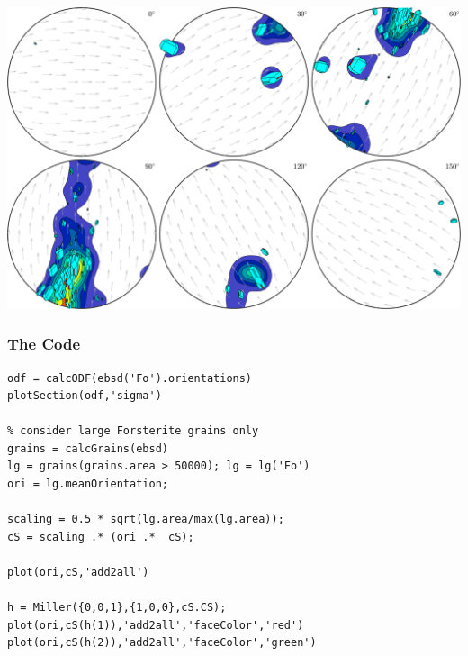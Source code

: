 \documentclass[compress]{beamer}
\begin{document}
\begin{frame}
  \begin{center}
    \includegraphics[width=\textwidth]{pic/odfOriSmoothSigmacS}
  \end{center}
\end{frame}



\begin{frame}[fragile]
  \frametitle{The Code}
  \begin{lstlisting}[style=input]
odf = calcODF(ebsd('Fo').orientations)
plotSection(odf,'sigma')

% consider large Forsterite grains only
grains = calcGrains(ebsd)
lg = grains(grains.area > 50000); lg = lg('Fo')
ori = lg.meanOrientation;

scaling = 0.5 * sqrt(lg.area/max(lg.area));
cS = scaling .* (ori .*  cS);

plot(ori,cS,'add2all')

h = Miller({0,0,1},{1,0,0},cS.CS);
plot(ori,cS(h(1)),'add2all','faceColor','red')
plot(ori,cS(h(2)),'add2all','faceColor','green')
  \end{lstlisting}
\end{frame}
\end{document}
